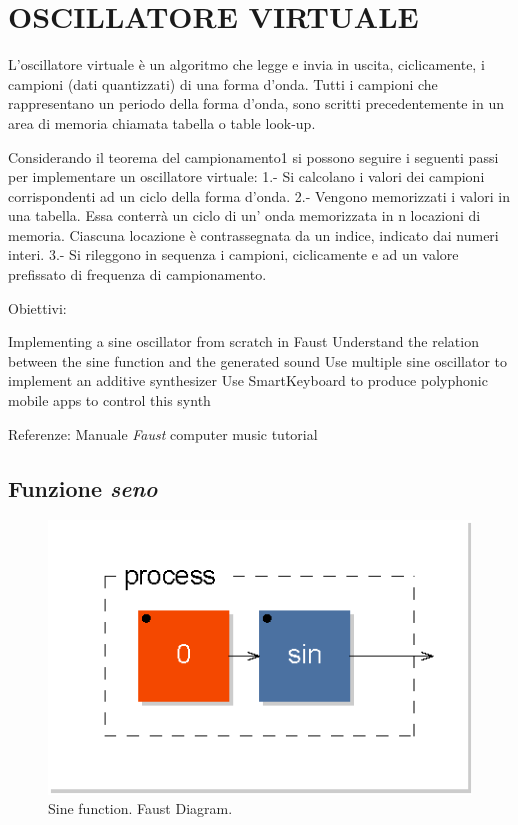 
\section{OSCILLATORE VIRTUALE}

L’oscillatore virtuale è un algoritmo che legge e invia in uscita,
ciclicamente, i campioni (dati quantizzati) di una forma d’onda.
Tutti i campioni che rappresentano un periodo della forma d’onda,
sono scritti precedentemente in un area di memoria chiamata tabella o table look-up.

Considerando il teorema del campionamento1 si possono seguire i seguenti passi per implementare un oscillatore virtuale:
1.- Si calcolano i valori dei campioni corrispondenti ad un ciclo della forma d’onda.
2.- Vengono memorizzati i valori in una tabella. Essa conterrà un ciclo di un' onda memorizzata in n locazioni di memoria. Ciascuna locazione è contrassegnata da un indice, indicato dai numeri interi.
3.- Si rileggono in sequenza i campioni, ciclicamente e ad un valore prefissato di frequenza di campionamento.


Obiettivi:

Implementing a sine oscillator from scratch in Faust
Understand the relation between the sine function and the generated sound
Use multiple sine oscillator to implement an additive synthesizer
Use SmartKeyboard to produce polyphonic mobile apps to control this synth

Referenze:
Manuale \emph{Faust}
computer music tutorial

\subsection{Funzione \emph{seno}}

\begin{figure}[ht]
  \centering
  \includegraphics[]{CAPITOLI/0700/CODES/0701-seno-svg/process}
  \caption[]{Sine function. Faust Diagram.}
  \label{fdsine}
\end{figure}

